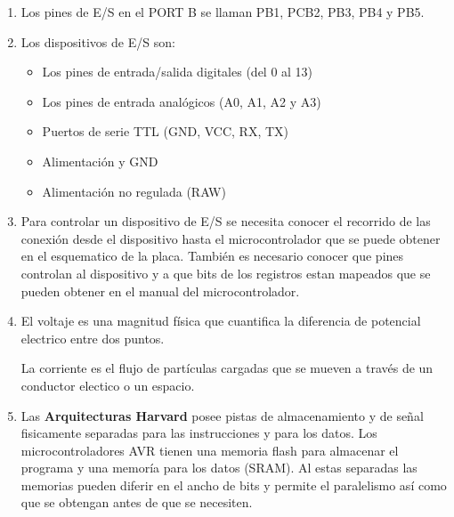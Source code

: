 \begin{enumerate}
\begin{enumerate}
                  \item
                        Los pines de E/S en el PORT B se llaman PB1, PCB2, PB3, PB4 y PB5.

                  \item
                        Los dispositivos de E/S son:

                        \begin{itemize}
                              \item Los pines de entrada/salida digitales (del 0 al 13)
                              \item Los pines de entrada analógicos (A0, A1, A2 y A3)
                              \item Puertos de serie TTL (GND, VCC, RX, TX)
                              \item Alimentación y GND
                              \item Alimentación no regulada (RAW)
                        \end{itemize}

                  \item
                        Para controlar un dispositivo de E/S se necesita conocer el recorrido de las conexión desde el dispositivo hasta el microcontrolador que se puede obtener en el esquematico de la placa. También es necesario conocer que pines controlan al dispositivo y a que bits de los registros estan mapeados que se pueden obtener en el manual del microcontrolador.

                  \item
                        El voltaje es una magnitud física que cuantifica la diferencia de potencial electrico entre dos puntos.

                        La corriente es el flujo de partículas cargadas que se mueven a través de un conductor electico o un espacio.

                  \item
                        Las \textbf{Arquitecturas Harvard} posee pistas de almacenamiento y de señal fisicamente separadas para las instrucciones y para los datos. Los microcontroladores AVR tienen una memoria flash para almacenar el programa y una memoría para los datos (SRAM). Al estas separadas las memorias pueden diferir en el ancho de bits y permite el paralelismo así como que se obtengan antes de que se necesiten.
            \end{enumerate}

\end{enumerate}